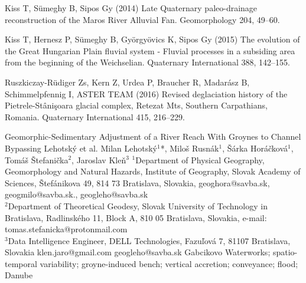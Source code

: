 {Kiss T, Sümeghy B, Sipos Gy (2014) Late Quaternary paleo-drainage reconstruction of the Maros River Alluvial Fan. Geomorphology 204, 49–60.
	
Kiss T, Hernesz P, Sümeghy B, Györgyövics K, Sipos Gy (2015) The evolution of the Great Hungarian Plain fluvial system - Fluvial processes in a subsiding area from the beginning of the Weichselian. Quaternary International 388, 142–155. 

Ruszkiczay-Rüdiger Zs, Kern Z, Urdea P, Braucher R, Madarász B, Schimmelpfennig I, ASTER TEAM (2016) Revised deglaciation history of the Pietrele-Stânişoara glacial complex, Retezat Mts, Southern Carpathians, Romania. Quaternary International 415, 216–229.
}%

\abstract
{Geomorphic-Sedimentary Adjustment of a River Reach With Groynes to Channel Bypassing} %
{Lehotský et al.} %
{Milan Lehotský$^1$*, Miloš Rusnák$^1$, Šárka Horáčková$^1$, 
	Tomáš Štefanička$^2$, Jaroslav Kleň$^3$} %
{\KLtag} %
{$^1$Department of Physical Geography, Geomorphology and Natural Hazards, Institute of Geography, Slovak Academy of Sciences, Štefánikova 49, 814 73 Bratislava, Slovakia, geoghora@savba.sk, geogmilo@savba.sk., geogleho@savba.sk \\
$^2$Department of Theoretical Geodesy, Slovak University of Technology in Bratislava, Radlinského 11, Block A, 810 05 Bratislava, Slovakia, e-mail: tomas.stefanicka@protonmail.com\\
$^3$Data Intelligence Engineer, DELL Technologies, Fazuľová 7, 81107 Bratislava, Slovakia  klen.jaro@gmail.com
} %
{geogleho@savba.sk}  %
{Gabcikovo Waterworks; spatio-temporal variability; groyne-induced bench; vertical accretion; conveyance; flood; Danube }%
